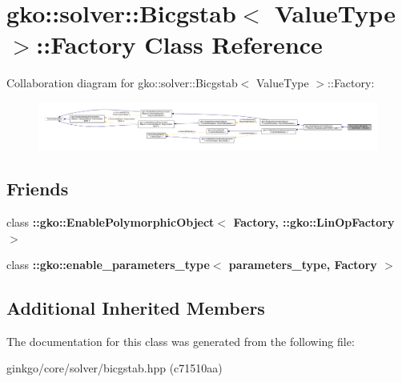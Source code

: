 \hypertarget{classgko_1_1solver_1_1Bicgstab_1_1Factory}{}\section{gko\+:\+:solver\+:\+:Bicgstab$<$ Value\+Type $>$\+:\+:Factory Class Reference}
\label{classgko_1_1solver_1_1Bicgstab_1_1Factory}


Collaboration diagram for gko\+:\+:solver\+:\+:Bicgstab$<$ Value\+Type $>$\+:\+:Factory\+:
\nopagebreak
\begin{figure}[H]
\begin{center}
\leavevmode
\includegraphics[width=350pt]{classgko_1_1solver_1_1Bicgstab_1_1Factory__coll__graph}
\end{center}
\end{figure}
\subsection*{Friends}
\begin{DoxyCompactItemize}
\item 
\mbox{\label{classgko_1_1solver_1_1Bicgstab_1_1Factory_a27e9bbc94a1c1c59f40833153eda8f78}} 
class {\bfseries \+::gko\+::\+Enable\+Polymorphic\+Object$<$ Factory, \+::gko\+::\+Lin\+Op\+Factory $>$}
\item 
\mbox{\label{classgko_1_1solver_1_1Bicgstab_1_1Factory_a0d176cbd42d6214e11aee8c30ca256fc}} 
class {\bfseries \+::gko\+::enable\+\_\+parameters\+\_\+type$<$ parameters\+\_\+type, Factory $>$}
\end{DoxyCompactItemize}
\subsection*{Additional Inherited Members}


The documentation for this class was generated from the following file\+:\begin{DoxyCompactItemize}
\item 
ginkgo/core/solver/bicgstab.\+hpp (c71510aa)\end{DoxyCompactItemize}
